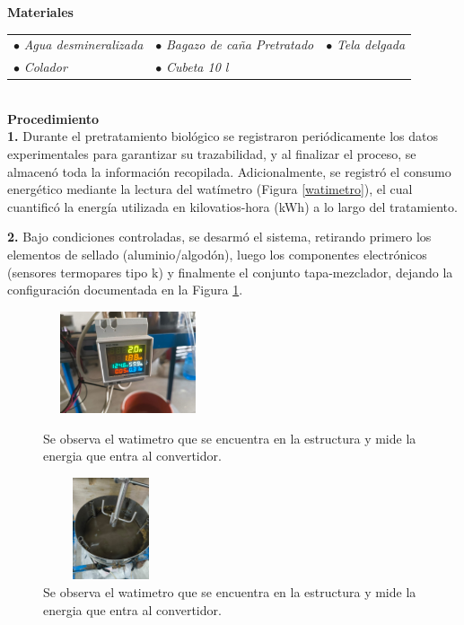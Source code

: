 \documentclass[12pt]{article}
\begin{document}
			 \textbf{Materiales}
			\\[0.5em]
		
			\begin{tabular}{p{0.3\textwidth}p{}p{}}
				$\bullet$ \textit{Agua desmineralizada} & $\bullet$ \textit{ Bagazo de caña Pretratado} & $\bullet$ \textit{Tela delgada}  \\
			
				$\bullet$ \textit{Colador} & $\bullet$ \textit{Cubeta 10 l} & 
			\end{tabular}
			\\[0.5em]
			
			
			\textbf{Procedimiento}
			\\[0.5em] 
			\textbf{1.} Durante el pretratamiento biológico se registraron periódicamente los datos experimentales para garantizar su trazabilidad, y al finalizar el proceso, se almacenó toda la información recopilada. Adicionalmente, se registró el consumo energético mediante la lectura del watímetro (Figura \ref{watimetro}), el cual cuantificó la energía utilizada en kilovatios-hora (kWh) a lo largo del tratamiento.
			
			
			\textbf{2.} Bajo condiciones controladas, se desarmó el sistema, retirando primero los elementos de sellado (aluminio/algodón), luego los componentes electrónicos (sensores termopares tipo k) y finalmente el conjunto tapa-mezclador, dejando la configuración documentada en la Figura \ref{biologico1}.
	
			
					
			\begin{figure}[H]
				\centering
				\begin{minipage}{0.46\textwidth}
					\centering
					\includegraphics[width=5cm, height=3cm]{imagenes/watimetro} %
					\caption{Se observa el watimetro que se encuentra en la estructura y mide la energia que entra al convertidor.}
						\label{watimetro}
					\end{minipage}
					\hfill
					\begin{minipage}{0.48\textwidth}
						\centering
						\includegraphics[width=4cm, height=3cm]{imagenes/biologico1} %
						\caption{Se observa el watimetro que se encuentra en la estructura y mide la energia que entra al convertidor.}
						\label{biologico1}
					\end{minipage}
				\end{figure}
				
\end{document}
